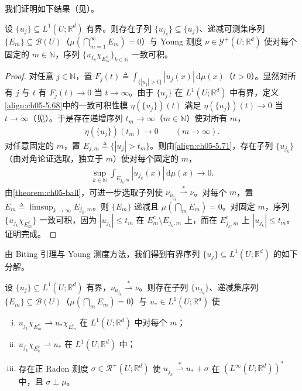 \documentclass[../../main.tex]{subfiles}%
\begin{document}
我们证明如下结果（见\cite[Theorem 2.1]{ref92}）。

\begin{theorem}[Biting 引理]\label{theorem:ch05-biting定理}\label{proposition:ch05-5.4.13}
设 $\{u_j\}\subseteq L^1(U;\mathbb{R}^d)$ 有界。则存在子列 $\{u_{j_k}\}\subseteq\{u_j\}$、递减可测集序列 $\{E_m\}\subseteq\mathscr{B}(U)$（$\mu(\bigcap_{m=1}^\infty E_m)=0$）与 Young 测度 $\nu\in\mathcal{Y}^+(U;\mathbb{R}^d)$ 使对每个固定的 $m\in\mathbb{N}$，序列 $\{u_{j_k}\chi_{E_m^c}\}_{k\in\mathbb{N}}$ 一致可积。
\end{theorem}

\begin{proof}
对任意 $j\in\mathbb{N}$，置 $F_j(t)\triangleq \int_{\{|u_j|>t\}}|u_j(x)|\,\mathrm{d}\mu(x)$（$t>0$）。显然对所有 $j$ 与 $t$ 有 $F_j(t)\to0$ 当 $t\to\infty$。由于 $\{u_j\}$ 在 $L^1(U;\mathbb{R}^d)$ 中有界，定义\eqref{align:ch05-5.68}中的一致可积性模 $\eta(\{u_j\})(t)$ 满足 $\eta(\{u_j\})(t)\to0$ 当 $t\to\infty$（见\cite[Theorem 1.29]{ref42}）。于是存在递增序列 $t_m\to\infty$（$m\in\mathbb{N}$）使对所有 $m$，
\begin{align}
\eta(\{u_j\})(t_m)\to0\qquad(m\to\infty).\label{align:ch05-5.71}
\end{align}
对任意固定的 $m$，置 $E_{j,m}\triangleq \{|u_j|>t_m\}$。则由\eqref{align:ch05-5.71}，存在子列 $\{u_{j_k}\}$（由对角论证选取，独立于 $m$）使对每个固定的 $m$，
\begin{align*}
\sup_{k\in\mathbb{N}}\int_{E_{j_k,m}}|u_{j_k}(x)|\,\mathrm{d}\mu(x)\to0.
\end{align*}
由\cref{theorem:ch05-ball}，可进一步选取子列使 $\nu_{u_{j_k}}\stackrel{*}{\rightharpoonup}\nu$。对每个 $m$，置 $E_m\triangleq \limsup_{k\to\infty}E_{j_k,m}$。则 $\{E_m\}$ 递减且 $\mu(\bigcap_m E_m)=0$。对固定 $m$，序列 $\{u_{j_k}\chi_{E_m^c}\}$ 一致可积，因为 $|u_{j_k}|\leqslant t_m$ 在 $E_m^c\setminus E_{j_k,m}$ 上，而在 $E_{j_k,m}^c$ 上 $|u_{j_k}|\leqslant t_m$。证明完成。
\end{proof}

由 Biting 引理与 Young 测度方法，我们得到有界序列 $\{u_j\}\subseteq L^1(U;\mathbb{R}^d)$ 的如下分解。

\begin{theorem}\label{theorem:ch05-分解}\label{proposition:ch05-集中测度极限}
设 $\{u_j\}\subseteq L^1(U;\mathbb{R}^d)$ 有界，$\nu_{u_{j_k}}\stackrel{*}{\rightharpoonup}\nu$。则存在子列 $\{u_{j_k}\}$、递减集序列 $\{E_m\}\subseteq\mathscr{B}(U)$（$\mu(\bigcap_m E_m)=0$）与 $u_*\in L^1(U;\mathbb{R}^d)$ 使
\begin{enumerate}[(i)]
\item $u_{j_k}\chi_{E_m^c}\rightharpoonup u_*\chi_{E_m^c}$ 在 $L^1(U;\mathbb{R}^d)$ 中对每个 $m$；
\item $u_{j_k}\chi_{E_k^c}\rightharpoonup u_*$ 在 $L^1(U;\mathbb{R}^d)$ 中；
\item 存在正 Radon 测度 $\sigma\in\mathscr{R}^+(U;\mathbb{R}^d)$ 使 $u_{j_k}\stackrel{*}{\rightharpoonup}u_*+\sigma$ 在 $(L^\infty(U;\mathbb{R}^d))^*$ 中，且 $\sigma\perp\mu$。
\end{enumerate}
\end{theorem}
\end{document}
